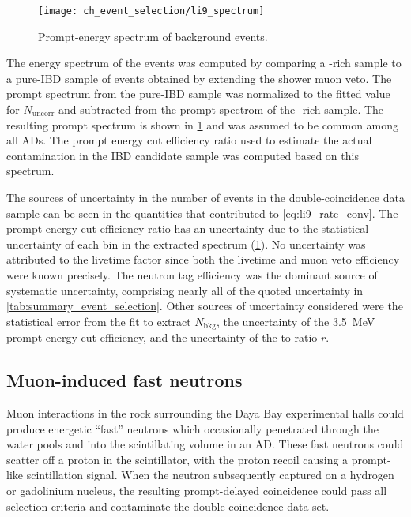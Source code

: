 \begin{figure}
    \centering
    \texttt{[image: ch\_event\_selection/li9\_spectrum]}
    \caption{
        Prompt-energy spectrum of \li{} background events.
    }
    \label{fig:li9_spec}
\end{figure}

The energy spectrum of the \li{} events was computed
by comparing a \li{}-rich sample to a pure-IBD sample of events
obtained by extending the shower muon veto.
The prompt spectrum from the pure-IBD sample
was normalized to the fitted value for $N_\text{uncorr}$
and subtracted from the prompt spectrom of the \li{}-rich sample.
The resulting \li{} prompt spectrum is shown in \cref{fig:li9_spec}
and was assumed to be common among all ADs.
The prompt energy cut efficiency ratio
used to estimate the actual contamination in the IBD candidate sample
was computed based on this spectrum.

The sources of uncertainty in the number of \li{} events
in the double-coincidence data sample
can be seen in the quantities that contributed to \cref{eq:li9_rate_conv}.
The prompt-energy cut efficiency ratio has an uncertainty
due to the statistical uncertainty of each bin in the extracted \li{} spectrum
(\cref{fig:li9_spec}).
No uncertainty was attributed to the livetime factor since
both the livetime and muon veto efficiency were known precisely.
The neutron tag efficiency
was the dominant source of systematic uncertainty,
comprising nearly all of the quoted uncertainty in \cref{tab:summary_event_selection}.
Other sources of uncertainty considered were
the statistical error from the fit to extract $N_\text{bkg}$,
the uncertainty of the \SI{3.5}{\MeV} prompt energy cut efficiency,
and the uncertainty of the \li{} to \he{} ratio $r$.

\subsection{Muon-induced fast neutrons}
\label{subsec:fastn}

Muon interactions in the rock surrounding the Daya Bay experimental halls
could produce energetic ``fast'' neutrons
which occasionally penetrated through the water pools
and into the scintillating volume in an AD.
These fast neutrons could scatter off a proton in the scintillator,
with the proton recoil causing a prompt-like scintillation signal.
When the neutron subsequently captured on a hydrogen or gadolinium nucleus,
the resulting prompt-delayed coincidence
could pass all selection criteria and contaminate the double-coincidence data set.

